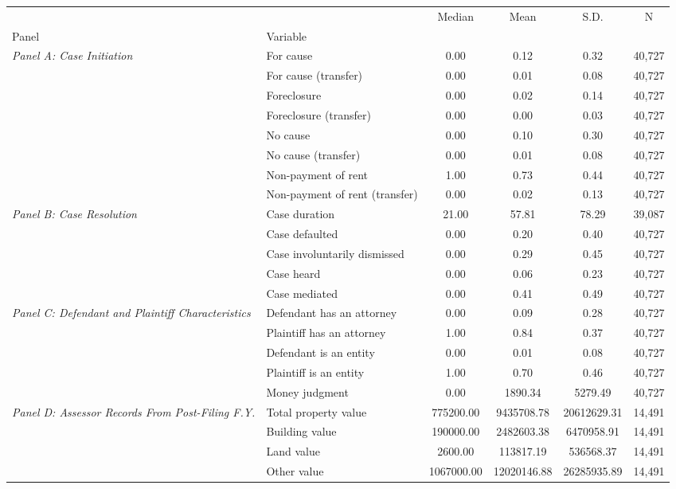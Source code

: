 \begin{tabular}{llcccc}
\toprule
 &  & Median & Mean & S.D. & N \\
Panel & Variable &  &  &  &  \\
\midrule
\multirow[c]{8}{4cm}{\textit{Panel A: Case Initiation}} & For cause & 0.00 & 0.12 & 0.32 & 40,727 \\
 & For cause (transfer) & 0.00 & 0.01 & 0.08 & 40,727 \\
 & Foreclosure & 0.00 & 0.02 & 0.14 & 40,727 \\
 & Foreclosure (transfer) & 0.00 & 0.00 & 0.03 & 40,727 \\
 & No cause & 0.00 & 0.10 & 0.30 & 40,727 \\
 & No cause (transfer) & 0.00 & 0.01 & 0.08 & 40,727 \\
 & Non-payment of rent & 1.00 & 0.73 & 0.44 & 40,727 \\
 & Non-payment of rent (transfer) & 0.00 & 0.02 & 0.13 & 40,727 \\
\cline{1-6}
\multirow[c]{5}{4cm}{\textit{Panel B: Case Resolution}} & Case duration & 21.00 & 57.81 & 78.29 & 39,087 \\
 & Case defaulted & 0.00 & 0.20 & 0.40 & 40,727 \\
 & Case involuntarily dismissed & 0.00 & 0.29 & 0.45 & 40,727 \\
 & Case heard & 0.00 & 0.06 & 0.23 & 40,727 \\
 & Case mediated & 0.00 & 0.41 & 0.49 & 40,727 \\
\cline{1-6}
\multirow[c]{5}{4cm}{\textit{Panel C: Defendant and Plaintiff Characteristics}} & Defendant has an attorney & 0.00 & 0.09 & 0.28 & 40,727 \\
 & Plaintiff has an attorney & 1.00 & 0.84 & 0.37 & 40,727 \\
 & Defendant is an entity & 0.00 & 0.01 & 0.08 & 40,727 \\
 & Plaintiff is an entity & 1.00 & 0.70 & 0.46 & 40,727 \\
 & Money judgment & 0.00 & 1890.34 & 5279.49 & 40,727 \\
\cline{1-6}
\multirow[c]{5}{4cm}{\textit{Panel D: Assessor Records From Post-Filing F.Y.}} & Total property value & 775200.00 & 9435708.78 & 20612629.31 & 14,491 \\
 & Building value & 190000.00 & 2482603.38 & 6470958.91 & 14,491 \\
 & Land value & 2600.00 & 113817.19 & 536568.37 & 14,491 \\
 & Other value & 1067000.00 & 12020146.88 & 26285935.89 & 14,491 \\

\end{tabular}
